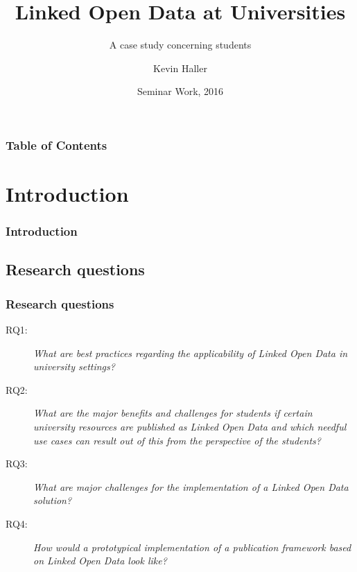 \documentclass{beamer}
\begin{document}

\title[LOD] {Linked Open Data at Universities}
\subtitle {A case study concerning students}
\author[Author, Haller] {Kevin Haller}
\date[2016] {Seminar Work, 2016}
\subject{Computer Science}

\frame{\titlepage}

\begin{frame}
\frametitle{Table of Contents}
\tableofcontents[hideallsubsections]
\end{frame}


\section[Introduction]{Introduction}
\begin{frame}
\frametitle{Introduction}
\end{frame}

\subsection[Research questions]{Research questions}
\begin{frame}
\frametitle{Research questions}
\begin{description}
	\item[RQ1:] \textit{What are best practices regarding the applicability of Linked Open Data in university
settings?}
	\item[RQ2:] \textit{What are the major benefits and challenges for students if certain university resources
are published as Linked Open Data and which needful use cases can result out of this from the
perspective of the students?}
	\item[RQ3:] \textit{What are major challenges for the implementation of a Linked Open Data solution?}
	\item[RQ4:] \textit{How would a prototypical implementation of a publication framework based on Linked Open
Data look like?}
\end{description}
\end{frame}

\end{document}
